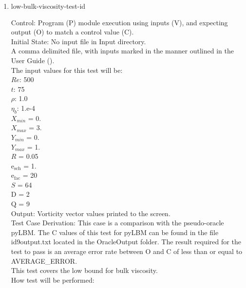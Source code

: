 \documentclass[12pt, titlepage]{article}
\newcounter{testcounter} %
\begin{document}
\begin{enumerate}
\item{low-bulk-viscosity-test-id\thetestcounter \\}

Control: Program (P) module execution using inputs (V), and expecting output (O) to match a control value (C).\\
					
Initial State: No input file in Input directory.\\
					
A comma delimited file, with inputs marked in the manner outlined in the User
Guide (\citet{LBM_UserGuide_PM}).\\The input values for this test will be:\\

$Re$: 500\\
$t$: 75\\
$\rho$: 1.0\\
$\eta_b$: 1.e-4\\
$X_{min}$ = 0.\\
$X_{max}$ = 3.\\
$Y_{min}$ = 0.\\
$Y_{max}$ = 1.\\
$R$ = 0.05\\
$\mathrm{e_{sch}}$ = 1.\\
$\mathrm{e_{fac}}$ = 20\\
$S$ = 64\\
$\mathrm{D}$ = 2\\
$\mathrm{Q}$ = 9\\

Output: Vorticity vector values printed to the screen.  \\

Test Case Derivation: This case is a comparison with the pseudo-oracle
pyLBM. The C values of this test for pyLBM can be found in the file
id9output.txt located in the OracleOutput folder. The result required for the
test to pass is an average error rate between O and C of less than or equal to
AVERAGE\_ERROR.\\
This test covers the low bound for bulk viscosity.\\
		
How test will be performed: 


\end{enumerate}
\end{document}
